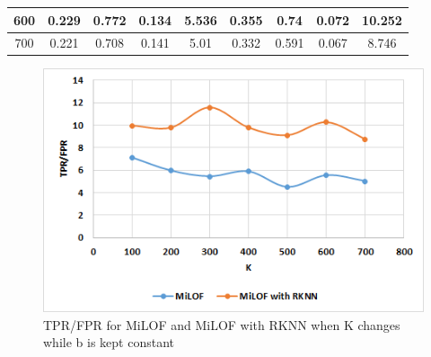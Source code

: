 \begin{table}[H]
\begin{tabular}{|c|c|c|c|c|c|c|c|c|}
		600                       & 0.229                          & 0.772                              & 0.134                    & 5.536                        & 0.355                          & 0.74                               & 0.072                    & 10.252                       \\ \hline
		700                       & 0.221                          & 0.708                              & 0.141                    & 5.01                         & 0.332                          & 0.591                              & 0.067                    & 8.746                        \\ \hline
	\end{tabular}
\end{table}

\begin{figure}[H]
	\centering
	\includegraphics{chap04/varyK.png}
	\caption{TPR/FPR for MiLOF and MiLOF with RKNN when K changes while b is kept constant }
\end{figure}

